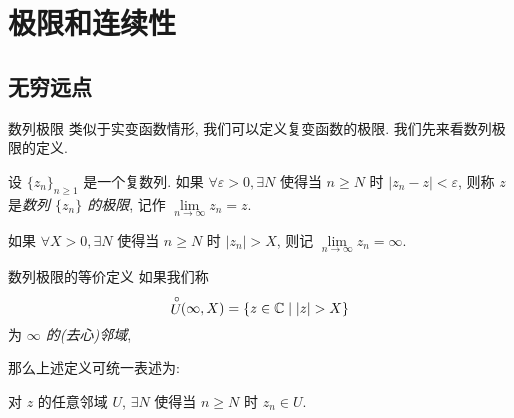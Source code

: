 \section{极限和连续性}


\subsection{无穷远点}
\begin{frame}{数列极限}
	\onslide<+->
	类似于实变函数情形, 我们可以定义复变函数的极限.
	\onslide<+->
	我们先来看数列极限的定义.
	\onslide<+->
	\begin{definition}[数列极限的定义]
		设 $\{z_n\}_{n\ge 1}$ 是一个复数列.
		如果 $\forall \varepsilon>0,\exists N$ 使得当 $n\ge N$ 时 $|z_n-z|<\varepsilon$, 则称 $z$ 是\emph{数列 $\{z_n\}$ 的极限}, 记作 \emph{$\lim\limits_{n\to\infty}z_n=z$}.
	\end{definition}
	\onslide<+->
	如果 $\forall X>0,\exists N$ 使得当 $n\ge N$ 时 $|z_n|>X$, 则记 $\lim\limits_{n\to\infty}z_n=\infty$.
\end{frame}


\begin{frame}{数列极限的等价定义}
	\onslide<+->
	如果我们称
	\[\Uc(\infty,X)=\set{z\in\BC\mid|z|>X}\]
	为 \emph{$\infty$ 的(去心)邻域},
	\onslide<+->
	\begin{center}
	\end{center}
	\onslide<+->
	那么上述定义可统一表述为:

	\onslide<+->
	\begin{definition}[数列极限的等价定义]
		对 $z$ 的任意邻域 $U$, $\exists N$ 使得当 $n\ge N$ 时 $z_n\in U$.
	\end{definition}
\end{frame}



